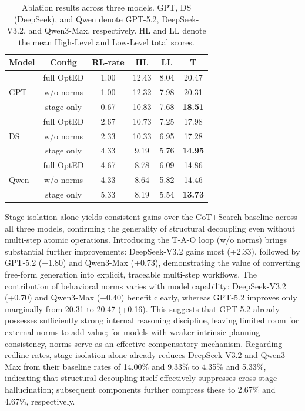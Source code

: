 \documentclass[letterpaper]{article} %
\begin{document}
\begin{table}[t]
\centering
\small
\begin{tabular}{lccccc}
\toprule
Model & Config & RL-rate & HL & LL & T \\
\midrule
\multirow{3}{*}{GPT} & full OptED & 1.00 & 12.43 & 8.04 & 20.47 \\
& w/o norms & 1.00 & 12.32 & 7.98 & 20.31 \\
& stage only & 0.67 & 10.83 & 7.68 & \textbf{18.51} \\
\midrule
\multirow{3}{*}{DS} & full OptED & 2.67 & 10.73 & 7.25 & 17.98 \\
& w/o norms & 2.33 & 10.33 & 6.95 & 17.28 \\
& stage only & 4.33 & 9.19 & 5.76 & \textbf{14.95} \\
\midrule
\multirow{3}{*}{Qwen} & full OptED & 4.67 & 8.78 & 6.09 & 14.86 \\
& w/o norms & 4.33 & 8.64 & 5.82 & 14.46 \\
& stage only & 5.33 & 8.19 & 5.54 & \textbf{13.73} \\
\bottomrule
\end{tabular}
\caption{Ablation results across three models. GPT, DS (DeepSeek), and Qwen denote GPT-5.2, DeepSeek-V3.2, and Qwen3-Max, respectively. HL and LL denote the mean High-Level and Low-Level total scores.}
\label{ablation}
\end{table}

Stage isolation alone yields consistent gains over the CoT+Search baseline across all three models, confirming the 
generality of structural decoupling even without multi-step atomic operations. Introducing the T-A-O loop (w/o norms) 
brings substantial further improvements: DeepSeek-V3.2 gains most (+2.33), followed by GPT-5.2 (+1.80) and Qwen3-Max (+0.73), 
demonstrating the value of converting free-form generation into explicit, traceable multi-step workflows. The contribution of 
behavioral norms varies with model capability: DeepSeek-V3.2 (+0.70) and Qwen3-Max (+0.40) benefit clearly, whereas GPT-5.2 
improves only marginally from 20.31 to 20.47 (+0.16). This suggests that GPT-5.2 already possesses sufficiently strong 
internal reasoning discipline, leaving limited room for external norms to add value; for models with weaker intrinsic 
planning consistency, norms serve as an effective compensatory mechanism. Regarding redline rates, stage isolation alone 
already reduces DeepSeek-V3.2 and Qwen3-Max from their baseline rates of 14.00\% and 9.33\% to 4.35\% and 5.33\%, indicating 
that structural decoupling itself effectively suppresses cross-stage hallucination; subsequent components further compress 
these to 2.67\% and 4.67\%, respectively.
\end{document}

